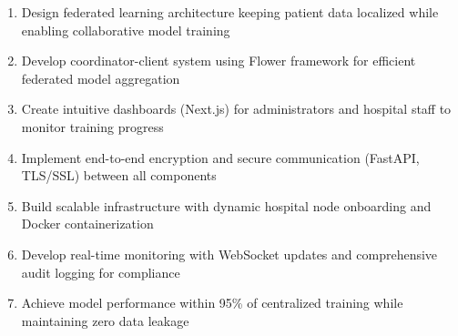 \begin{enumerate}[noitemsep]
    \item Design federated learning architecture keeping patient data localized while enabling collaborative model training
    \item Develop coordinator-client system using Flower framework for efficient federated model aggregation
    \item Create intuitive dashboards (Next.js) for administrators and hospital staff to monitor training progress
    \item Implement end-to-end encryption and secure communication (FastAPI, TLS/SSL) between all components
    \item Build scalable infrastructure with dynamic hospital node onboarding and Docker containerization
    \item Develop real-time monitoring with WebSocket updates and comprehensive audit logging for compliance
    \item Achieve model performance within 95\% of centralized training while maintaining zero data leakage
\end{enumerate}
